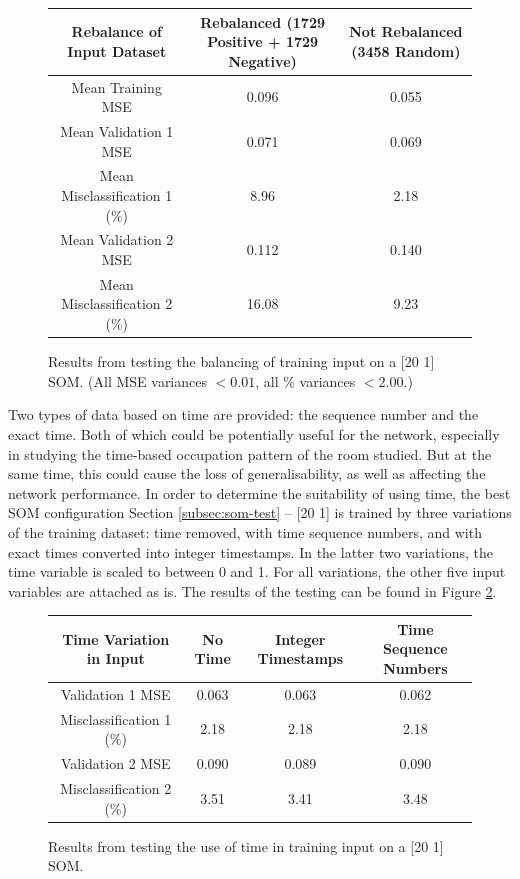 \documentclass[10pt, oneside]{article}
\begin{document}
\begin{figure}[h]
\begin{center}
\fontsize{9}{11}\selectfont
\begin{tabular}{|c|c|c|}
\hline 
Rebalance of Input Dataset & Rebalanced (1729 Positive + 1729 Negative) & Not Rebalanced (3458 Random) \\ \hline
Mean Training MSE & 0.096 & 0.055 \\ \hline \hline 
Mean Validation 1 MSE & 0.071 & 0.069 \\ \hline 
Mean Misclassification 1 (\%) & 8.96 & 2.18 \\ \hline \hline 
Mean Validation 2 MSE & 0.112 & 0.140 \\ \hline 
Mean Misclassification 2 (\%) & 16.08 & 9.23 \\ \hline
\end{tabular}
\end{center}
\caption{\label{fig:equalize-testing} Results from testing the balancing of training input on a [20 1] SOM. (All MSE variances $<0.01$, all \% variances $<2.00$.)}
\end{figure}

Two types of data based on time are provided: the sequence number and the exact time. Both of which could be potentially useful for the network, especially in studying the time-based occupation pattern of the room studied. But at the same time, this could cause the loss of generalisability, as well as affecting the network performance. In order to determine the suitability of using time, the best SOM configuration Section \ref{subsec:som-test} -- [20 1] is trained by three variations of the training dataset: time removed, with time sequence numbers, and with exact times converted into integer timestamps. In the latter two variations, the time variable is scaled to between 0 and 1. For all variations, the other five input variables are attached as is. The results of the testing can be found in Figure \ref{fig:time-testing}.

\begin{figure}[h]
\begin{center}
\fontsize{9}{11}\selectfont
\begin{tabular}{|c|c|c|c|}
\hline 
Time Variation in Input & No Time & Integer Timestamps & Time Sequence Numbers \\ \hline \hline 
Validation 1 MSE & 0.063 & 0.063 & 0.062 \\ \hline 
Misclassification 1 (\%) & 2.18 & 2.18 & 2.18 \\ \hline \hline 
Validation 2 MSE &  0.090 & 0.089 & 0.090 \\ \hline 
Misclassification 2 (\%) & 3.51 & 3.41 & 3.48 \\ \hline 
\end{tabular}
\end{center}
\caption{\label{fig:time-testing} Results from testing the use of time in training input on a [20 1] SOM.}
\end{figure}
\end{document}
